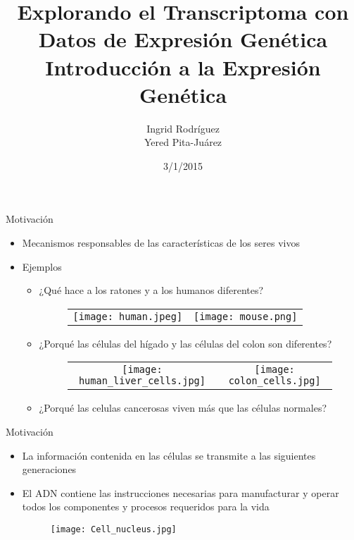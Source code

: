 \documentclass{beamer}
\begin{document}
\title[Introducción a la Expresión Genética]{Explorando el Transcriptoma con Datos de Expresi\'{o}n Gen\'{e}tica\\
\vspace{0.5cm}
Introducción a la Expresión Genética}
\author{Ingrid Rodr\'{i}guez\\
Yered Pita-Ju\'{a}rez}
\date{3/1/2015}


\begin{frame}
\titlepage
\end{frame}

\begin{frame}{Motivación}
\begin{itemize}
\item Mecanismos responsables de las características de los seres vivos
\item Ejemplos
\begin{itemize}
\item ¿Qué hace a los ratones y a los humanos diferentes?
\begin{figure}[H]
\centering
\begin{tabular}{cc}
\texttt{[image: human.jpeg]} &   \texttt{[image: mouse.png]} \\
\end{tabular}
\end{figure}
\item ¿Porqué las células del hígado y las células del colon son diferentes?
\begin{figure}[H]
\centering
\begin{tabular}{cc}
\texttt{[image: human\_liver\_cells.jpg]} &   \texttt{[image: colon\_cells.jpg]} \\
\end{tabular}
\end{figure}
\item ¿Porqué las celulas cancerosas viven más que las células normales?
\end{itemize}
\end{itemize}
\end{frame}

\begin{frame}{Motivación}
\begin{itemize}
\item La información contenida en las células se transmite a las siguientes generaciones
\item El ADN contiene las instrucciones necesarias para manufacturar y operar todos los componentes y procesos requeridos para la vida
\begin{figure}[H]
\centering
\texttt{[image: Cell\_nucleus.jpg]}
\end{figure}
\end{itemize}
\end{frame}
\end{document}

